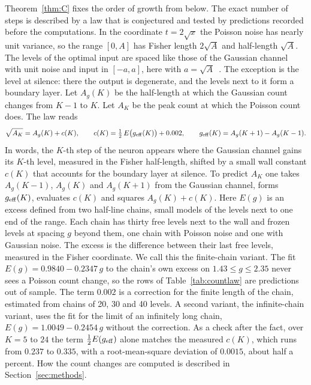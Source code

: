 \documentclass[10pt,letterpaper]{article}
\begin{document}
Theorem~\ref{thm:C} fixes the order of growth from below. The exact number of steps is described by a law that is conjectured and
tested by predictions recorded before the computations. In the coordinate $t=2\sqrt x$ the Poisson noise has nearly unit variance,
so the range $[0,A]$ has Fisher length $2\sqrt A$ and half-length $\sqrt A$. The levels of the optimal input are spaced like those
of the Gaussian channel with unit noise and input in $[-a,a]$, here with $a=\sqrt A$~\cite{Paper1}. The exception is the level at silence: there the output
is degenerate, and the levels next to it form a boundary layer. Let $A_g(K)$ be the half-length at which the Gaussian count changes
from $K-1$ to $K$. Let $A_K$ be the peak count at which the Poisson count does. The law reads
\begin{equation}
\sqrt{A_K}=A_g(K)+c(K),\qquad c(K)=\tfrac12\,E\bigl(g_{\rm eff}(K)\bigr)+0.002,\qquad g_{\rm eff}(K)=A_g(K+1)-A_g(K-1).\label{eq:countlaw}
\end{equation}
In words, the $K$-th step of the neuron appears where the Gaussian channel gains its $K$-th level, measured in the Fisher
half-length, shifted by a small wall constant $c(K)$ that accounts for the boundary layer at silence. To predict $A_K$ one takes
$A_g(K-1)$, $A_g(K)$ and $A_g(K+1)$ from the Gaussian channel, forms $g_{\rm eff}(K)$, evaluates $c(K)$ and squares
$A_g(K)+c(K)$. Here $E(g)$ is an excess defined from two half-line chains, small models of the levels next to one end of the range.
Each chain has thirty free levels next to the wall and frozen levels at spacing $g$ beyond them, one chain with Poisson noise and one
with Gaussian noise. The excess is the difference
between their last free levels, measured in the Fisher coordinate. We call this the finite-chain variant. The fit $E(g)=0.9840-0.2347\,g$
to the chain's own excess on $1.43\le g\le2.35$ never sees a Poisson count change, so the rows of Table~\ref{tab:countlaw} are
predictions out of sample. The term $0.002$ is a correction for the finite length of the chain, estimated
from chains of 20, 30 and 40 levels. A second variant, the infinite-chain variant, uses the fit for the limit of an infinitely long chain, $E(g)=1.0049-0.2454\,g$ without the
correction. As a check after the fact, over $K=5$ to $24$ the term $\frac12E(g_{\rm eff})$ alone matches the measured $c(K)$, which runs from $0.237$ to $0.335$, with a root-mean-square deviation of $0.0015$, about half a percent.
How the count changes are computed is described in Section~\ref{sec:methods}.
\end{document}
